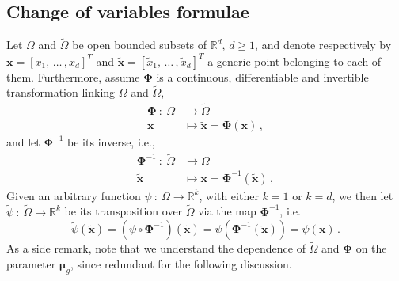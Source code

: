 \documentclass[12pt, a4paper, twoside, openright]{report}
\numberwithin{equation}{chapter}
\theoremstyle{theorem}
\theoremstyle{definition}
\theoremstyle{remark}
\theoremstyle{proposition}
\numberwithin{figure}{chapter}
\newcommand{\wt}[1]{\widetilde{#1}}
\newcommand{\bg}[1]{\boldsymbol{#1}}
\begin{document}
	\subsection{Change of variables formulae}
	\label{section:Change of variables formulae}   
	
		Let $\Omega$ and $\wt{\Omega}$ be open bounded subsets of $\mathbb{R}^d$, $d \geq 1$, and denote respectively by $\bg{x} = [x_1, \, \ldots \, , x_d]^T$ and $\wt{\bg{x}} = [\wt{x}_1, \, \ldots \, , \wt{x}_d]^T$ a generic point belonging to each of them. Furthermore, assume $\bg{\Phi}$ is a continuous, differentiable and invertible transformation linking $\Omega$ and $\wt{\Omega}$,
		\begin{equation*}
			\begin{aligned}
				\bg{\Phi} ~ : ~ \Omega & \rightarrow \wt{\Omega} \\
				\bg{x} & \mapsto \wt{\bg{x}} = \bg{\Phi}(\bg{x}) \, , 
			\end{aligned}
		\end{equation*}
		and let $\bg{\Phi}^{-1}$ be its inverse, i.e.,
		\begin{equation*}
			\begin{aligned}
				\bg{\Phi}^{-1} ~ : ~ \wt{\Omega} & \rightarrow \Omega \\
				\wt{\bg{x}} & \mapsto \bg{x} = \bg{\Phi}^{-1}(\wt{\bg{x}}) \, , 
			\end{aligned}
		\end{equation*}
		Given an arbitrary function $\psi ~ : ~ \Omega \rightarrow \mathbb{R}^k$, with either $k = 1$ or $k = d$, we then let $\wt{\psi} ~ : ~ \wt{\Omega} \rightarrow \mathbb{R}^k$ be its transposition over $\wt{\Omega}$ via the map $\bg{\Phi}^{-1}$, i.e.
		\begin{equation*}
			\wt{\psi}(\wt{\bg{x}}) = (\psi \circ \bg{\Phi}^{-1})(\wt{\bg{x}}) = \psi(\bg{\Phi}^{-1}(\wt{\bg{x}})) = \psi(\bg{x}) \, .
		\end{equation*}
		As a side remark, note that we understand the dependence of $\wt{\Omega}$ and $\bg{\Phi}$ on the parameter $\bg{\mu}_g$, since redundant for the following discussion.
		
\end{document}
